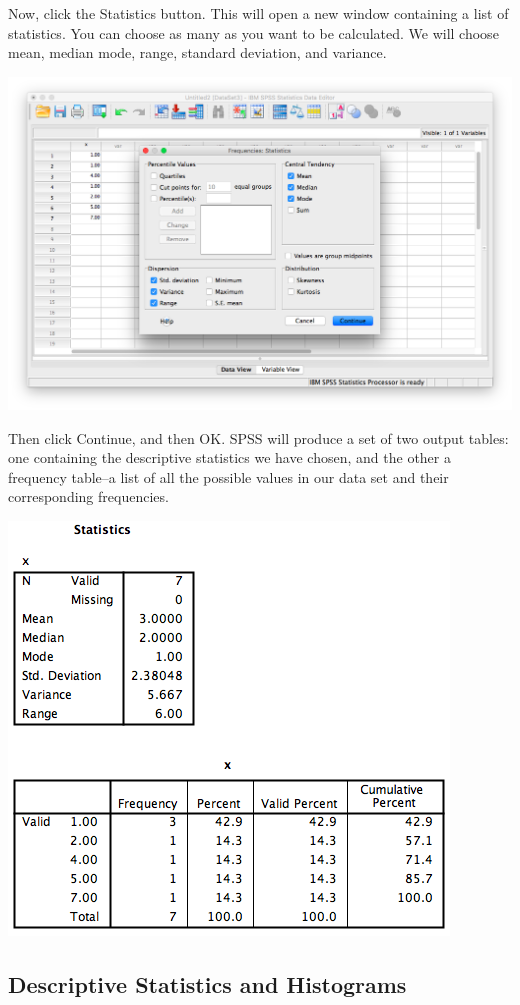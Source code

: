 \documentclass[
]{book}
\begin{document}
Now, click the {Statistics} button. This will open a new window containing a list of statistics. You can choose as many as you want to be calculated. We will choose {mean, median mode, range, standard deviation, and variance}.

\includegraphics{img/2.4.14.png}

Then click {Continue}, and then {OK}. SPSS will produce a set of two output tables: one containing the descriptive statistics we have chosen, and the other a frequency table--a list of all the possible values in our data set and their corresponding frequencies.

\includegraphics{img/2.4.15.png}

\hypertarget{descriptive-statistics-and-histograms}{%
\subsection{Descriptive Statistics and Histograms}\label{descriptive-statistics-and-histograms}}
\end{document}
